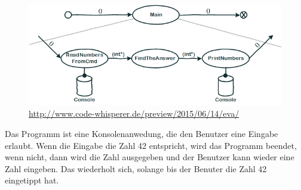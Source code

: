 \documentclass[11pt]{article}
\begin{document}
\begin{figure}[htb]
\centering
\includegraphics[width=.9\linewidth]{./img/FlowDesign2.png}
\caption{\url{http://www.code-whisperer.de/preview/2015/06/14/eva/}}
\end{figure}


Das Programm ist eine Konsolenanwedung, die den Benutzer eine Eingabe erlaubt.
Wenn die Eingabe die Zahl 42 entspricht, wird das Programm beendet, wenn nicht,
dann wird die Zahl ausgegeben und der Benutzer kann wieder eine Zahl eingeben.
Das wiederholt sich, solange bis der Benuter die Zahl 42 eingetippt hat.
\end{document}
